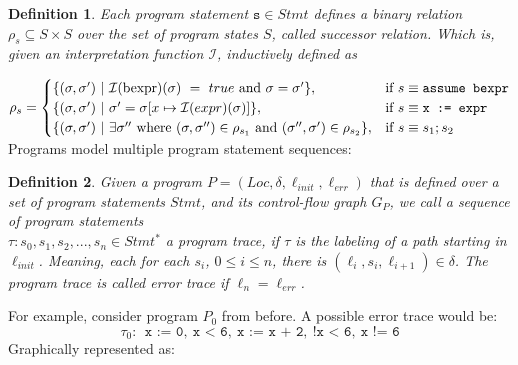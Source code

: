 \documentclass{article}
\newtheorem{mydef}{Definition}
\begin{document}
\begin{mydef}
	Each program statement $\texttt{s} \in Stmt$ defines a binary relation $\rho_s \subseteq S \times S$ over the set of program states $S$, called successor relation. Which is, given an interpretation function $\mathcal{I}$, inductively defined as \\
\end{mydef}
	 $ \rho_s =
\begin{cases}
	\{(\sigma, \sigma')\ |\ \mathcal{I}(\text{bexpr})(\sigma)\ =\ true\ \text{and}\ \sigma = \sigma'\} , & \text{if}\ s \equiv \text{\texttt{assume bexpr}} \\
	\{(\sigma, \sigma')\ |\ \sigma' = \sigma[x \mapsto \mathcal{I}(expr)(\sigma)]\} , & \text{if}\ s \equiv \texttt{x := expr} \\
	\{(\sigma, \sigma')\ |\ \exists \sigma''\ \text{where}\ (\sigma, \sigma'') \in \rho_{s_1}\ \text{and}\ (\sigma'', \sigma') \in \rho_{s_2} \}, & \text{if}\ s \equiv \texttt{$s_1;s_2$}
\end{cases}
$
\vspace{0.7cm} \\ 
Programs model multiple program statement sequences:
\begin{mydef}
Given a program $P = (Loc, \delta, \ell_{init}, \ell_{err})$ that is defined over a set of program statements $Stmt$, and its control-flow graph $G_P$, we call a sequence of program statements \\ $\tau: s_0, s_1, s_2, ..., s_n \in Stmt^*$ a program trace, if $\tau$ is the labeling of a path starting in $\ell_{init}$. Meaning, each for each $s_i$, $0 \leq i \leq n$, there is $(\ell_i, s_i, \ell_{i+1}) \in \delta$. The program trace is called error trace if $\ell_n = \ell_{err}$.  
\end{mydef}

For example, consider program $P_0$ from before. A possible error trace would be:
\begin{equation*}
	\tau_0:\ \ \texttt{x := 0},\ \texttt{x < 6},\ \texttt{x := x + 2},\ \texttt{!x < 6},\ \texttt{x != 6}
\end{equation*}
Graphically represented as:
\end{document}

